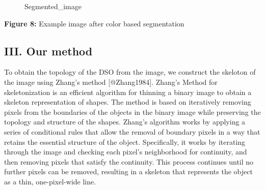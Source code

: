 \begin{figure}
\centering
{}
\caption{Segmented\_image}
\end{figure}

\textbf{Figure 8:} Example image after color based segmentation

\subsection{III. Our method}\label{iii.-our-method}

To obtain the topology of the DSO from the image, we construct the
skeloton of the image using Zhang's method {[}@Zhang1984{]}. Zhang's
Method for skeletonization is an efficient algorithm for thinning a
binary image to obtain a skeleton representation of shapes. The method
is based on iteratively removing pixels from the boundaries of the
objects in the binary image while preserving the topology and structure
of the shapes. Zhang's algorithm works by applying a series of
conditional rules that allow the removal of boundary pixels in a way
that retains the essential structure of the object. Specifically, it
works by iterating through the image and checking each pixel's
neighborhood for continuity, and then removing pixels that satisfy the
continuity. This process continues until no further pixels can be
removed, resulting in a skeleton that represents the object as a thin,
one-pixel-wide line.

